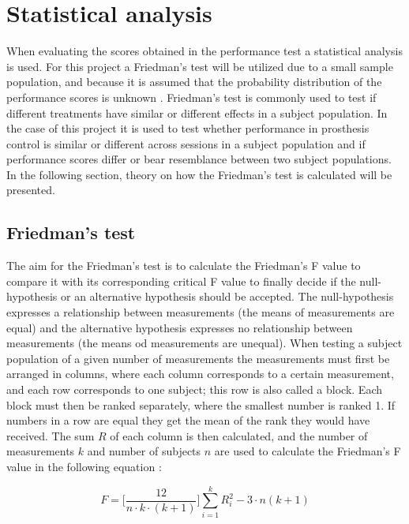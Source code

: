 \section{Statistical analysis} \label{sec:BG:statisticalAnalysis}
When evaluating the scores obtained in the performance test a statistical analysis is used. For this project a Friedman's test will be utilized due to a small sample population, and because it is assumed that the probability distribution of the performance scores is unknown \cite{Zar2009}. Friedman's test is commonly used to test if different treatments have similar or different effects in a subject population. In the case of this project it is used to test whether performance in prosthesis control is similar or different across sessions in a subject population and if performance scores differ or bear resemblance between two subject populations. In the following section, theory on how the Friedman's test is calculated will be presented.

\subsection{Friedman's test} \label{sub:BG:Friedman}
The aim for the Friedman's test is to calculate the Friedman's F value to compare it with its corresponding critical F value to finally decide if the null-hypothesis or an alternative hypothesis should be accepted. The null-hypothesis expresses a relationship between measurements (the means of measurements are equal) and the alternative hypothesis expresses no relationship between measurements (the means od measurements are unequal).
When testing a subject population of a given number of measurements the measurements must first be arranged in columns, where each column corresponds to a certain measurement, and each row corresponds to one subject; this row is also called a block. Each block must then be ranked separately, where the smallest number is ranked 1. If numbers in a row are equal they get the mean of the rank they would have received. The sum $R$ of each column is then calculated, and the number of measurements $k$ and number of subjects $n$ are used to calculate the Friedman's F value in the following equation \cite{Zar2009}:

\begin{equation}
	F = \Big[\frac{12}{n \cdot k \cdot (k+1)}\Big] \sum_{i=1}^{k} R_{i}^{2} - 3 \cdot n(k + 1)
\end{equation}

